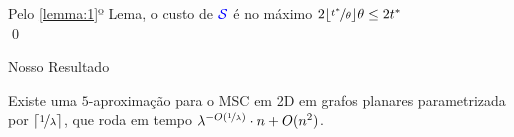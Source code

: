\begin{frame}{}
    \centering
    Pelo \ref{lemma:1}º Lema, o custo de ${\color{blue} \mathcal{S}}$ é no máximo $2\lfloor\nicefrac{t^*}{\theta}\rfloor\theta \le 2t^*$ \\\qed
\end{frame}

\begin{frame}{Nosso Resultado}
  \begin{cor}
    Existe uma $5$-aproximação para o MSC em 2D em grafos planares parametrizada por $\lceil \nicefrac{1}{\lambda} \rceil$, que roda em tempo $\lambda^{-O(\nicefrac{1}{\lambda})} \cdot n + O(n^2)$.
  \end{cor}
\end{frame}
